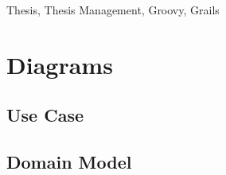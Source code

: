 \documentclass[11pt,oneside]{fithesis2}
\begin{document}
\FrontMatter
\ThesisTitlePage

\begin{ThesisDeclaration}		
\DeclarationText
\end{ThesisDeclaration}

\begin{ThesisKeyWords}
    Thesis, Thesis Management, Groovy, Grails
\end{ThesisKeyWords}

\MainMatter

\tableofcontents












\appendix

\chapter{Diagrams}

\section{Use Case}

\section{Domain Model}
\end{document}
